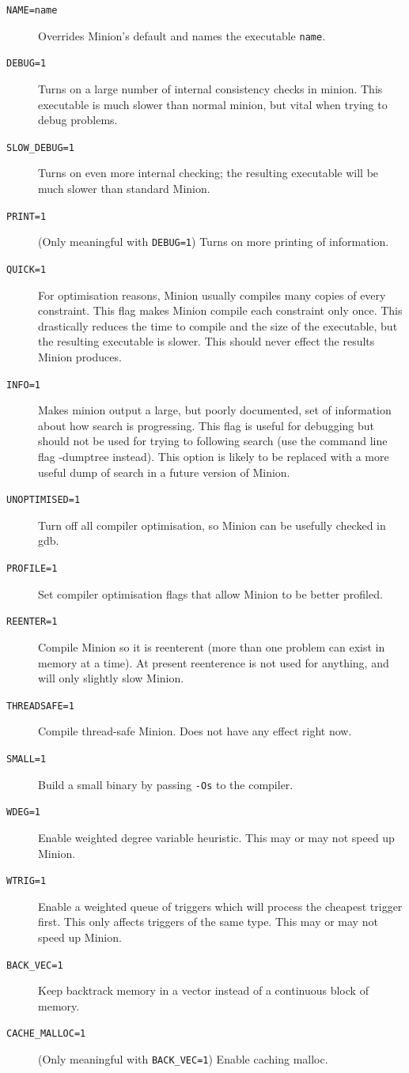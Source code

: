 \documentclass[oneside]{book}
\begin{document}
\begin{description}
\item[\texttt{NAME=name}] Overrides Minion's default and names the executable
\verb+name+.
\item[\texttt{DEBUG=1}] Turns on a large number of internal consistency checks in
minion. This executable is much slower than normal minion, but vital when trying
to debug problems.
\item[\texttt{SLOW\_DEBUG=1}] Turns on even more internal checking; the resulting
executable will be much slower than standard Minion.
\item[\texttt{PRINT=1}] (Only meaningful with \verb+DEBUG=1+) Turns on
more printing of information.
\item[\texttt{QUICK=1}] For optimisation reasons, Minion usually compiles many copies of
every constraint. This flag makes Minion compile each constraint only once. This
drastically reduces the time to compile and the size of the executable, but the
resulting executable is slower. This should never effect the results Minion
produces.
\item[\texttt{INFO=1}] Makes minion output a large, but poorly documented, set of
information about how search is progressing. This flag is useful for debugging
but should not be used for trying to following search (use the command line flag
-dumptree instead). This option is likely to be replaced with a more useful dump
of search in a future version of Minion.
\item[\texttt{UNOPTIMISED=1}] Turn off all compiler optimisation, so Minion can be
usefully checked in gdb.
\item[\texttt{PROFILE=1}] Set compiler optimisation flags that allow Minion to be
better profiled.
\item[\texttt{REENTER=1}] Compile Minion so it is reenterent (more than one
problem can exist in memory at a time). At present reenterence is not used for
anything, and will only slightly slow Minion.
\item[\texttt{THREADSAFE=1}] Compile thread-safe Minion. Does not have any effect
right now.
\item[\texttt{SMALL=1}] Build a small binary by passing \verb+-Os+ to the
compiler.
\item[\texttt{WDEG=1}] Enable weighted degree variable heuristic. This may or may
not speed up Minion.
\item[\texttt{WTRIG=1}] Enable a weighted queue of triggers which will process the
cheapest trigger first. This only affects triggers of the same type. This may or
may not speed up Minion.
\item[\texttt{BACK\_VEC=1}] Keep backtrack memory in a vector instead of a
continuous block of memory.
\item[\texttt{CACHE\_MALLOC=1}] (Only meaningful with \verb+BACK_VEC=1+) Enable
caching malloc.
\end{description}
\end{document}
